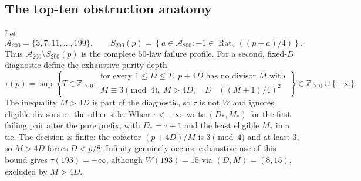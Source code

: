 \documentclass[10pt,reqno]{amsart}
\theoremstyle{definition}
\newcommand{\1}{\mathbf 1}
\begin{document}
\subsection{The top-ten obstruction anatomy}
Let
\begin{equation}\tag{67.1}
 \mathcal A_{200}=\{3,7,11,\ldots,199\},\qquad
 S_{200}(p)=\left\{a\in\mathcal A_{200}:
 -1\in\operatorname {Rat}_a((p+a)/4)\right\}.
\end{equation}
Thus $\mathcal A_{200}\setminus S_{200}(p)$ is the complete $50$-law
failure profile.  For a second, fixed-$D$ diagnostic define the exhaustive
purity depth
\begin{equation}\tag{67.2}
 \tau(p)=\sup\left\{T\in\mathbb Z_{\geq0}:\begin{array}{l}
  \text{for every }1\leq D\leq T,\ p+4D\text{ has no divisor }M\text{ with}\\
  M\equiv3\pmod4,\ M>4D,\quad D\mid((M+1)/4)^2
 \end{array}\right\}\in\mathbb Z_{\geq0}\cup\{+\infty\}.
\end{equation}
The inequality $M>4D$ is part of the diagnostic, so $\tau$ is not $W$ and
ignores eligible divisors on the other side.  When $\tau<+\infty$, write
$(D_*,M_*)$ for the first failing pair after the pure prefix, with
$D_*=\tau+1$ and the least eligible $M_*$ in a tie.  The decision is finite:
the cofactor $(p+4D)/M$ is $3\pmod4$ and at least $3$, so $M>4D$ forces
$D<p/8$.  Infinity genuinely occurs: exhaustive use of this bound gives
$\tau(193)=+\infty$, although $W(193)=15$ via $(D,M)=(8,15)$, excluded by
$M>4D$.
\end{document}
